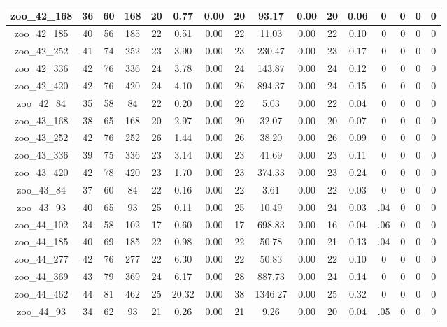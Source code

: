\begin{landscape}
\begin{longtable}{|c|c|c|c|c|c|c|c|c|c|c|c|c|c|c|c|}
zoo\_42\_168 & 36 & 60 & 168 & 20 & 0.77 & 0.00 & 20 & 93.17 & 0.00 & 20 & 0.06 & 0 & 0 & 0 & 0 \\ \hline 
zoo\_42\_185 & 40 & 56 & 185 & 22 & 0.51 & 0.00 & 22 & 11.03 & 0.00 & 22 & 0.10 & 0 & 0 & 0 & 0 \\ \hline 
zoo\_42\_252 & 41 & 74 & 252 & 23 & 3.90 & 0.00 & 23 & 230.47 & 0.00 & 23 & 0.17 & 0 & 0 & 0 & 0 \\ \hline 
zoo\_42\_336 & 42 & 76 & 336 & 24 & 3.78 & 0.00 & 24 & 143.87 & 0.00 & 24 & 0.12 & 0 & 0 & 0 & 0 \\ \hline 
zoo\_42\_420 & 42 & 76 & 420 & 24 & 4.10 & 0.00 & 26 & 894.37 & 0.00 & 24 & 0.15 & 0 & 0 & 0 & 0 \\ \hline 
zoo\_42\_84 & 35 & 58 & 84 & 22 & 0.20 & 0.00 & 22 & 5.03 & 0.00 & 22 & 0.04 & 0 & 0 & 0 & 0 \\ \hline 
zoo\_43\_168 & 38 & 65 & 168 & 20 & 2.97 & 0.00 & 20 & 32.07 & 0.00 & 20 & 0.07 & 0 & 0 & 0 & 0 \\ \hline 
zoo\_43\_252 & 42 & 76 & 252 & 26 & 1.44 & 0.00 & 26 & 38.20 & 0.00 & 26 & 0.09 & 0 & 0 & 0 & 0 \\ \hline 
zoo\_43\_336 & 39 & 75 & 336 & 23 & 3.14 & 0.00 & 23 & 41.69 & 0.00 & 23 & 0.11 & 0 & 0 & 0 & 0 \\ \hline 
zoo\_43\_420 & 42 & 78 & 420 & 23 & 1.70 & 0.00 & 23 & 374.33 & 0.00 & 23 & 0.24 & 0 & 0 & 0 & 0 \\ \hline 
zoo\_43\_84 & 37 & 60 & 84 & 22 & 0.16 & 0.00 & 22 & 3.61 & 0.00 & 22 & 0.03 & 0 & 0 & 0 & 0 \\ \hline 
zoo\_43\_93 & 40 & 65 & 93 & 25 & 0.11 & 0.00 & 25 & 10.49 & 0.00 & 24 & 0.03 & .04 & 0 & 0 & 0 \\ \hline 
zoo\_44\_102 & 34 & 58 & 102 & 17 & 0.60 & 0.00 & 17 & 698.83 & 0.00 & 16 & 0.04 & .06 & 0 & 0 & 0 \\ \hline 
zoo\_44\_185 & 40 & 69 & 185 & 22 & 0.98 & 0.00 & 22 & 50.78 & 0.00 & 21 & 0.13 & .04 & 0 & 0 & 0 \\ \hline 
zoo\_44\_277 & 42 & 76 & 277 & 22 & 6.30 & 0.00 & 22 & 50.83 & 0.00 & 22 & 0.10 & 0 & 0 & 0 & 0 \\ \hline 
zoo\_44\_369 & 43 & 79 & 369 & 24 & 6.17 & 0.00 & 28 & 887.73 & 0.00 & 24 & 0.14 & 0 & 0 & 0 & 0 \\ \hline 
zoo\_44\_462 & 44 & 81 & 462 & 25 & 20.32 & 0.00 & 38 & 1346.27 & 0.00 & 25 & 0.32 & 0 & 0 & 0 & 0 \\ \hline 
zoo\_44\_93 & 34 & 62 & 93 & 21 & 0.26 & 0.00 & 21 & 9.26 & 0.00 & 20 & 0.04 & .05 & 0 & 0 & 0 \\ \hline 

\end{longtable}
\end{landscape}
